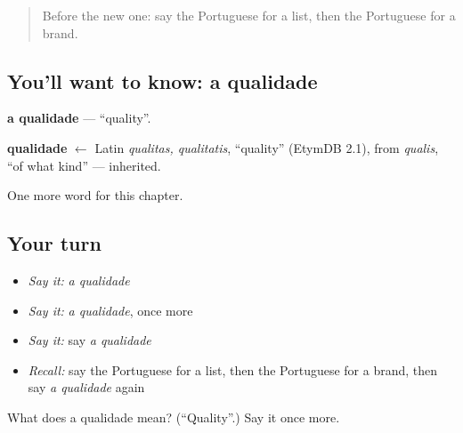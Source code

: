 \label{lesson:PT-C167-qualidade}



\begin{quote}
Before the new one: say the Portuguese for a list, then the Portuguese for a brand.
\end{quote}

\subsection*{You'll want to know: a qualidade}
\textbf{a qualidade} — \textquotedblleft{}quality\textquotedblright{}.

\begin{cousinweb}
\textbf{qualidade} $\leftarrow$ Latin \emph{qualitas, qualitatis}, \textquotedblleft{}quality\textquotedblright{} (EtymDB 2.1), from \emph{qualis}, \textquotedblleft{}of what kind\textquotedblright{} — inherited.
\end{cousinweb}

\begin{grammarlens}[title={What you've built}]
One more word for this chapter.
\end{grammarlens}

\subsection*{Your turn}
\begin{itemize}
\raggedright
  \item \emph{Say it:} \emph{a qualidade}
  \item \emph{Say it:} \emph{a qualidade}, once more
  \item \emph{Say it:} say \emph{a qualidade}
  \item \emph{Recall:} say the Portuguese for a list, then the Portuguese for a brand, then say \emph{a qualidade} again
\end{itemize}

\begin{tcolorbox}[breakable,colback=teal!4,colframe=teal!35!black,title={Before you move on}]
What does a qualidade mean? (\textquotedblleft{}Quality\textquotedblright{}.) Say it once more.
\end{tcolorbox}
